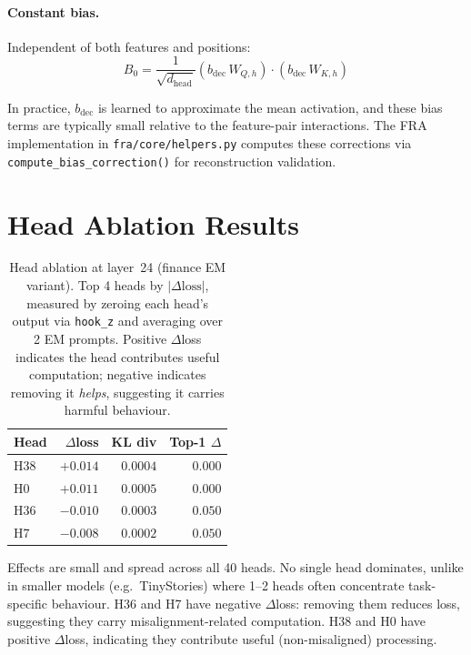 \documentclass{article}
\theoremstyle{plain}
\theoremstyle{definition}
\theoremstyle{remark}
\newcommand{\dhead}{d_{\mathrm{head}}}
\begin{document}
\paragraph{Constant bias.} Independent of both features and positions:
\begin{equation}
    B_0 = \frac{1}{\sqrt{\dhead}} \left( b_{\mathrm{dec}}\,W_{Q,h} \right) \cdot \left( b_{\mathrm{dec}}\,W_{K,h} \right)
\end{equation}

In practice, $b_{\mathrm{dec}}$ is learned to approximate the mean activation, and these bias terms are typically small relative to the feature-pair interactions. The FRA implementation in \texttt{fra/core/helpers.py} computes these corrections via \texttt{compute\_bias\_correction()} for reconstruction validation.


\section{Head Ablation Results}
\label{app:head_ablation}

\begin{table}[h]
\caption{Head ablation at layer~24 (finance EM variant). Top 4 heads by $|\Delta\text{loss}|$, measured by zeroing each head's output via \texttt{hook\_z} and averaging over 2 EM prompts. Positive $\Delta$loss indicates the head contributes useful computation; negative indicates removing it \emph{helps}, suggesting it carries harmful behaviour.}
\label{tab:head_ablation}
\centering
\begin{tabular}{lrrr}
\toprule
Head & $\Delta$loss & KL div & Top-1 $\Delta$ \\
\midrule
H38 & $+0.014$ & $0.0004$ & $0.000$ \\
H0  & $+0.011$ & $0.0005$ & $0.000$ \\
H36 & $-0.010$ & $0.0003$ & $0.050$ \\
H7  & $-0.008$ & $0.0002$ & $0.050$ \\
\bottomrule
\end{tabular}
\end{table}

Effects are small and spread across all 40 heads. No single head dominates, unlike in smaller models (e.g.\ TinyStories) where 1--2 heads often concentrate task-specific behaviour. H36 and H7 have negative $\Delta$loss: removing them reduces loss, suggesting they carry misalignment-related computation. H38 and H0 have positive $\Delta$loss, indicating they contribute useful (non-misaligned) processing.
\end{document}
